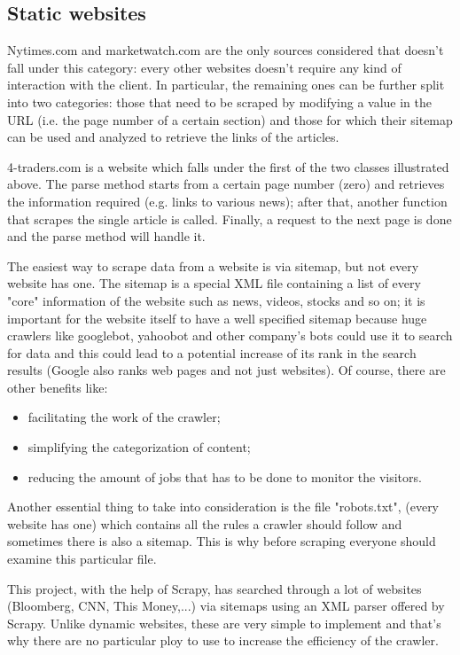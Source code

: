 \subsection{Static websites}
Nytimes.com and marketwatch.com are the only sources considered that doesn't fall under this category: every other websites doesn't require any kind of interaction with the client. In particular, the remaining ones can be further split into two categories: those that need to be scraped by modifying a value in the URL (i.e. the page number of a certain section) and those for which their sitemap can be used and analyzed to retrieve the links of the articles. 
\par
4-traders.com is a website which falls under the first of the two classes illustrated above. The parse method starts from a certain page number (zero) and retrieves the information required (e.g. links to various news); after that, another function that scrapes the single article is called. Finally, a request to the next page is done and the parse method will handle it.
\par 
The easiest way to scrape data from a website is via sitemap, but not every website has one. 
The sitemap is a special XML file containing a list of every "core" information of the website such as news, videos, stocks and so on; it is important for the website itself to have a well specified sitemap because huge crawlers like googlebot, yahoobot and other company's bots could use it to search for data and this could lead to a potential increase of its rank in the search results (Google also ranks web pages and not just websites). 
Of course, there are other benefits like:
\begin{itemize}
	\item facilitating the work of the crawler;
	\item simplifying the categorization of content;
	\item reducing the amount of jobs that has to be done to monitor the visitors.
\end{itemize}
Another essential thing to take into consideration is the file "robots.txt", (every website has one) which contains all the rules a crawler should follow and sometimes there is also a sitemap. 
This is why before scraping everyone should examine this particular file. 
\par 
This project, with the help of Scrapy, has searched through a lot of websites (Bloomberg, CNN, This Money,...) via sitemaps using an XML parser offered by Scrapy. 
Unlike dynamic websites, these are very simple to implement and that's why there are no particular ploy to use to increase the efficiency of the crawler. 
